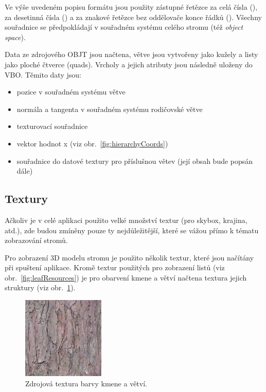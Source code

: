 Ve výše uvedeném popisu formátu jsou použity zástupné řetězce za celá čísla (), za desetinná čísla () a za znakové řetězce bez oddělovače konce řádků (). Všechny souřadnice se předpokládají v souřadném systému celého stromu (též \emph{object space}).

Data ze zdrojového OBJT jsou načtena, větve jsou vytvořeny jako kužely a listy jako ploché čtverce (quads). Vrcholy a jejich atributy jsou následně uloženy do VBO. Těmito daty jsou:
\begin{itemize}
\item pozice v souřadném systému větve
\item normála a tangenta v souřadném systému rodičovské větve
\item texturovací souřadnice
\item vektor hodnot x (viz obr.~\ref{fig:hierarchyCoords})
\item souřadnice do datové textury pro příslušnou větev (její obsah bude popsán dále)
\end{itemize}

\subsection{Textury}
\label{sec:Textury}
Ačkoliv je v celé aplikaci použito velké množství textur (pro skybox, krajina, atd.), zde budou zmíněny pouze ty nejdůležitější, které se vážou přímo k tématu zobrazování stromů.

Pro zobrazení 3D modelu stromu je použito několik textur, které jsou načítány při spuštení aplikace. Kromě textur použitých pro zobrazení listů (viz obr.~\ref{fig:leafResources}) je pro obarvení kmene a větví načtena textura jejich struktury (viz obr.~\ref{fig:branchResources}).
\begin{figure}[!hbt]
\begin{center}
\includegraphics[width=0.35\textwidth]{./figures/bark2_decal.png}
\end{center}
\caption[Zdrojová textura barvy kmene a větví]%
{Zdrojová textura barvy kmene a větví. \label{fig:branchResources}
}
\end{figure}

